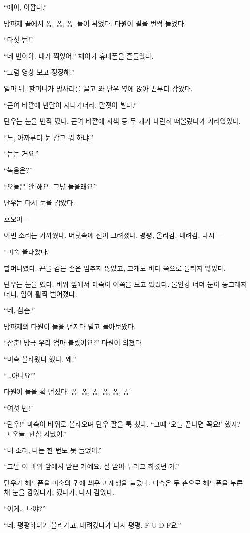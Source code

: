 \documentclass[
  korean,
  letterpaper,
  twoside,
  open=any,
  fontsize=12.5pt,
  headings=small]{scrbook}
\begin{document}
``에이, 아깝다.''

방파제 끝에서 퐁, 퐁, 퐁, 돌이
튀었다. 다원이 팔을 번쩍
들었다.

``다섯 번!''

``네 번이야. 내가 찍었어.''
채아가 휴대폰을 흔들었다.

``그럼 영상 보고 정정해.''

얼마 뒤, 할머니가 망사리를
끌고 와 단우 옆에 앉아 끈부터
감았다.

``큰여 바깥에 반달이
지나가더라. 말젯이 뵌다.''

단우는 눈을 번쩍 떴다. 큰여
바깥에 회색 등 두 개가 나란히
떠올랐다가 가라앉았다.

``느, 아까부터 눈 감고 뭐
하냐.''

``듣는 거요.''

``녹음은?''

``오늘은 안 해요. 그냥
들을래요.''

단우는 다시 눈을 감았다.

호오이---

이번 소리는 가까웠다. 머릿속에
선이 그려졌다. 평평, 올라감,
내려감, 다시---

``미숙 올라왔다.''

할머니였다. 끈을 감는 손은
멈추지 않았고, 고개도 바다
쪽으로 돌리지 않았다.

단우는 눈을 떴다. 바위 앞에서
미숙이 이쪽을 보고 있었다.
물안경 너머 눈이 동그래지더니,
입이 활짝 벌어졌다.

``네, 삼춘!''

방파제의 다원이 돌을 던지다
말고 돌아보았다.

``삼춘! 방금 우리 엄마
불렀어요?'' 다원이 외쳤다.

``미숙 올라왔다 했다. 왜.''

``\ldots 아니요!''

다원이 돌을 휙 던졌다. 퐁, 퐁,
퐁, 퐁, 퐁, 퐁.

``여섯 번!''

``단우!'' 미숙이 바위로
올라오며 단우 팔을 툭 쳤다.
``그때 `오늘 끝나면 꼭요!'
했지? 그 오늘, 한참 지났어.''

``내 소리, 나는 한 번도 못
들었어.''

``그날 이 바위 앞에서 받은
거예요. 잘 받아 두라고 하셨던
거.''

단우가 헤드폰을 미숙의 귀에
씌우고 재생을 눌렀다. 미숙은
두 손으로 헤드폰을 누른 채
눈을 감았다가, 떴다가, 다시
감았다.

``이게\ldots{} 나야?''

``네. 평평하다가 올라가고,
내려갔다가 다시 평평.
\mbox{F-U-D-F요.}''
\end{document}
